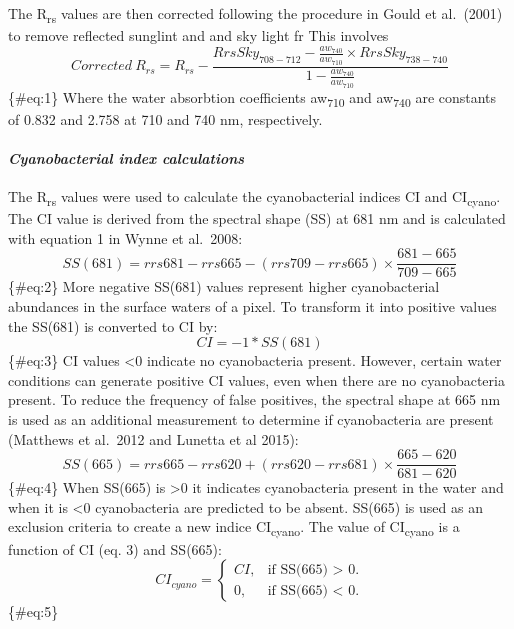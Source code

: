 \documentclass[
]{article}
\begin{document}
The R\textsubscript{rs} values are then corrected following the
procedure in Gould et al.~(2001) to remove reflected sunglint and and
sky light fr This involves \[
\begin{equation}
Corrected~R_{rs} = R_{rs} - \frac{RrsSky_{708-712} - \frac{aw_{740}}{aw_{710}} \times RrsSky_{738-740}}{1 - \frac{aw_{740}}{aw_{710}}}
\end{equation}
\] \{\#eq:1\} Where the water absorbtion coefficients
aw\textsubscript{710} and aw\textsubscript{740} are constants of 0.832
and 2.758 at 710 and 740 nm, respectively.

\hypertarget{cyanobacterial-index-calculations}{%
\paragraph{\texorpdfstring{\emph{Cyanobacterial index
calculations}}{Cyanobacterial index calculations}}\label{cyanobacterial-index-calculations}}

The R\textsubscript{rs} values were used to calculate the cyanobacterial
indices CI and CI\textsubscript{cyano}. The CI value is derived from the
spectral shape (SS) at 681 nm and is calculated with equation 1 in Wynne
et al.~2008: \[
\begin{equation}
SS(681) = rrs681 - rrs665 - (rrs709 - rrs665) \times \frac{681-665}{709-665}
\end{equation}
\] \{\#eq:2\} More negative SS(681) values represent higher
cyanobacterial abundances in the surface waters of a pixel. To transform
it into positive values the SS(681) is converted to CI by: \[
\begin{equation}
CI = -1*SS(681)
\end{equation}
\] \{\#eq:3\} CI values \textless0 indicate no cyanobacteria present.
However, certain water conditions can generate positive CI values, even
when there are no cyanobacteria present. To reduce the frequency of
false positives, the spectral shape at 665 nm is used as an additional
measurement to determine if cyanobacteria are present (Matthews et
al.~2012 and Lunetta et al 2015): \[
\begin{equation}
SS(665) = rrs665 - rrs620 + (rrs620 - rrs681) \times \frac{665-620}{681-620}
\end{equation}
\] \{\#eq:4\} When SS(665) is \textgreater0 it indicates cyanobacteria
present in the water and when it is \textless0 cyanobacteria are
predicted to be absent. SS(665) is used as an exclusion criteria to
create a new indice CI\textsubscript{cyano}. The value of
CI\textsubscript{cyano} is a function of CI (eq. 3) and SS(665): \[
\begin{equation}
  CI_{cyano}=\begin{cases}
    CI, & \text{if SS(665) > 0}.\\  
    0, & \text{if SS(665) < 0}.
  \end{cases}
\end{equation}
\] \{\#eq:5\}
\end{document}
